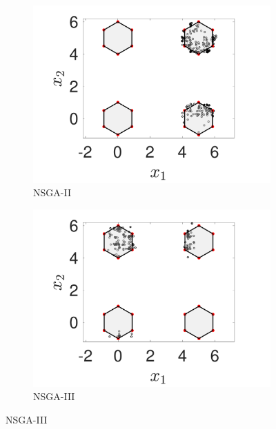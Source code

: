 \documentclass[conference]{IEEEtran}
\begin{document}
\begin{figure}[t!]
    \centering
    \begin{subfigure}[b]{.24\textwidth}
    \includegraphics[width=\linewidth]{Section5/dim4/PS/NSGAII}
    \caption{NSGA-II}
    \end{subfigure}
    \begin{subfigure}[b]{.24\textwidth}
    \includegraphics[width=\linewidth]{Section5/dim4/PS/NSGAIII}
    \caption{NSGA-III}
    \end{subfigure}
    

\end{figure}
\end{document}
